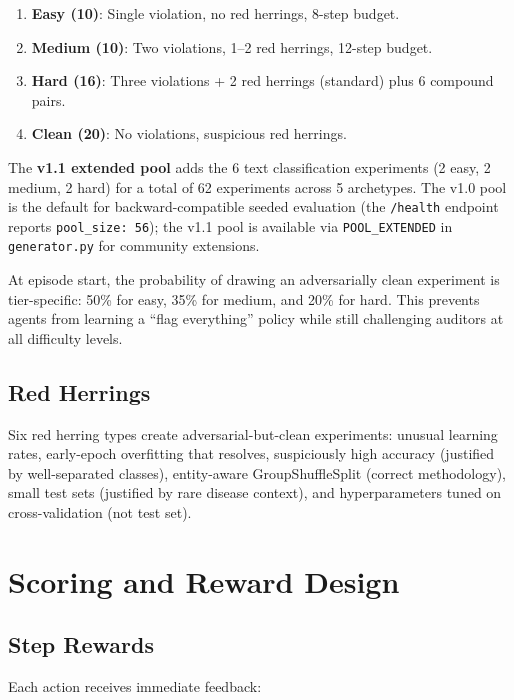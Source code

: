 \documentclass{article}
\begin{document}
\begin{enumerate}[nosep]
  \item \textbf{Easy (10)}: Single violation, no red herrings, 8-step budget.
  \item \textbf{Medium (10)}: Two violations, 1--2 red herrings, 12-step budget.
  \item \textbf{Hard (16)}: Three violations + 2 red herrings (standard) plus 6 compound pairs.
  \item \textbf{Clean (20)}: No violations, suspicious red herrings.
\end{enumerate}

The \textbf{v1.1 extended pool} adds the 6 text classification experiments
(2 easy, 2 medium, 2 hard) for a total of 62 experiments across 5 archetypes.
The v1.0 pool is the default for backward-compatible seeded evaluation
(the \texttt{/health} endpoint reports \texttt{pool\_size: 56});
the v1.1 pool is available via \texttt{POOL\_EXTENDED} in \texttt{generator.py}
for community extensions.

At episode start, the probability of drawing an adversarially
clean experiment is tier-specific: 50\% for easy, 35\% for medium, and
20\% for hard.  This prevents agents from learning a ``flag everything'' policy
while still challenging auditors at all difficulty levels.

\subsection{Red Herrings}

Six red herring types create adversarial-but-clean experiments:
unusual learning rates, early-epoch overfitting that resolves,
suspiciously high accuracy (justified by well-separated classes),
entity-aware GroupShuffleSplit (correct methodology), small test sets
(justified by rare disease context), and hyperparameters tuned on
cross-validation (not test set).

\section{Scoring and Reward Design}
\label{sec:scoring}

\subsection{Step Rewards}

Each action receives immediate feedback:
\end{document}
